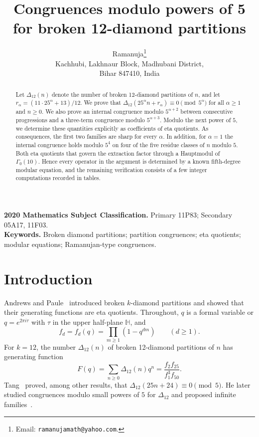 \documentclass[11pt]{article}
\title{Congruences modulo powers of 5 for broken 12-diamond partitions}
\author{Ramanuja\thanks{Email: \texttt{ramanujamath@yahoo.com}.}\\ Kachhubi, Lakhnaur Block, Madhubani District,\\ Bihar 847410, India}
\date{}
\theoremstyle{definition}
\theoremstyle{remark}
\numberwithin{equation}{section}
\newcommand{\HH}{\mathbb{H}}
\begin{document}
\maketitle

\begin{abstract}
Let $\Delta_{12}(n)$ denote the number of broken 12-diamond partitions of $n$, and let $r_\alpha=(11\cdot 25^\alpha+13)/12$. We prove that $\Delta_{12}(25^\alpha n+r_\alpha)\equiv 0 \pmod{5^\alpha}$ for all $\alpha\ge 1$ and $n\ge 0$. We also prove an internal congruence modulo $5^{\alpha+2}$ between consecutive progressions and a three-term congruence modulo $5^{\alpha+3}$. Modulo the next power of $5$, we determine these quantities explicitly as coefficients of eta quotients. As consequences, the first two families are sharp for every $\alpha$. In addition, for $\alpha=1$ the internal congruence holds modulo $5^4$ on four of the five residue classes of $n$ modulo $5$. Both eta quotients that govern the extraction factor through a Hauptmodul of $\Gamma_0(10)$. Hence every operator in the argument is determined by a known fifth-degree modular equation, and the remaining verification consists of a few integer computations recorded in tables.
\end{abstract}

\noindent\textbf{2020 Mathematics Subject Classification.} Primary 11P83; Secondary 05A17, 11F03.\\
\textbf{Keywords.} Broken diamond partitions; partition congruences; eta quotients; modular equations; Ramanujan-type congruences.

\section{Introduction}\label{sec:intro}

Andrews and Paule~\cite{AP} introduced broken $k$-diamond partitions and showed that their generating functions are eta quotients. Throughout, $q$ is a formal variable or $q=e^{2\pi i\tau}$ with $\tau$ in the upper half-plane $\HH$, and
\[
f_d=f_d(q)=\prod_{m\ge1}(1-q^{dm})\qquad(d\ge1).
\]
For $k=12$, the number $\Delta_{12}(n)$ of broken 12-diamond partitions of $n$ has generating function~\cite{AP}
\begin{equation}\label{eq:gf}
F(q)=\sum_{n\ge0}\Delta_{12}(n)q^n=\frac{f_2f_{25}}{f_1^3f_{50}}.
\end{equation}
Tang~\cite[Theorem~1]{T1} proved, among other results, that $\Delta_{12}(25n+24)\equiv0\pmod5$. He later studied congruences modulo small powers of $5$ for $\Delta_{12}$ and proposed infinite families~\cite{T2}.
\end{document}
